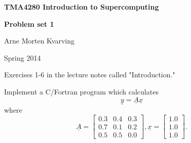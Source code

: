 \documentclass[11pt]{article}
\begin{document}
\centerline{\LARGE\textbf{TMA4280 Introduction to Supercomputing}}

\vspace*{5ex}

\centerline{\Large\textbf{Problem set 1}}

\large

\vspace*{8ex}
\centerline{Arne Morten Kvarving}

\vspace*{4ex}
\centerline{Spring 2014}

\vspace{1in}
Exercises 1-6 in the lecture notes called "Introduction." \\
\vspace{0.5in}

Implement a C/Fortran program which calculates
\[
  \underline{y} = \underline{A}\underline{x}
\]
where 
\[
  \underline{A} = 
    \begin{bmatrix}
      0.3 & 0.4 & 0.3 \\
      0.7 & 0.1 & 0.2 \\
      0.5 & 0.5 & 0.0
    \end{bmatrix},
    \underline{x} = \begin{bmatrix}
                      1.0 \\
                      1.0 \\
                      1.0
                    \end{bmatrix}.
\]
\end{document}
